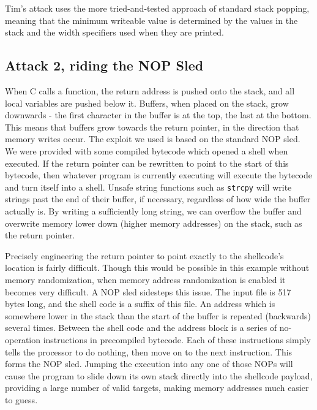 Tim's attack uses the more tried-and-tested approach of standard stack popping, meaning that the minimum writeable value
is determined by the values in the stack and the width specifiers used when they are printed.

\subsection{Attack 2, riding the NOP Sled}

When C calls a function, the return address is pushed onto the stack, and all local variables are pushed below it.
Buffers, when placed on the stack, grow downwards - the first character in the buffer is at the top, the last at the
bottom. This means that buffers grow towards the return pointer, in the direction that memory writes occur. The exploit
we used is based on the standard NOP sled. We were provided with some compiled bytecode which opened a shell when
executed. If the return pointer can be rewritten to point to the start of this bytecode, then whatever program is
currently executing will execute the bytecode and turn itself into a shell. Unsafe string functions such as {\tt strcpy}
will write strings past the end of their buffer, if necessary, regardless of how wide the buffer actually is. By writing
a sufficiently long string, we can overflow the buffer and overwrite memory lower down (higher memory addresses) on the
stack, such as the return pointer.

Precisely engineering the return pointer to point exactly to the shellcode's location is fairly difficult. Though this
would be possible in this example without memory randomization, when memory address randomization is enabled it becomes
very difficult. A NOP sled sidesteps this issue. The input file is 517 bytes long, and the shell code is a suffix of
this file. An address which is somewhere lower in the stack than the start of the buffer is repeated (backwards) several
times. Between the shell code and the address block is a series of no-operation instructions in precompiled bytecode.
Each of these instructions simply tells the processor to do nothing, then move on to the next instruction. This forms
the NOP sled. Jumping the execution into any one of those NOPs will cause the program to slide down its own stack
directly into the shellcode payload, providing a large number of valid targets, making memory addresses much easier to
guess.

